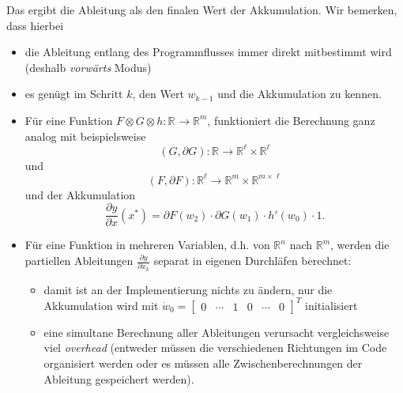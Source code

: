 \documentclass[
]{book}
\providecommand{\tightlist}{%
  \setlength{\itemsep}{0pt}\setlength{\parskip}{0pt}}
\theoremstyle{definition}
\theoremstyle{definition}
\theoremstyle{definition}
\theoremstyle{definition}
\theoremstyle{remark}
\begin{document}
Das ergibt die Ableitung als den finalen Wert der Akkumulation. Wir bemerken,
dass hierbei

\begin{itemize}
\tightlist
\item
  die Ableitung entlang des Programmflusses immer direkt mitbestimmt wird
  (deshalb \emph{vorwärts} Modus)
\item
  es genügt im Schritt \(k\), den Wert \(w_{k-1}\) und die Akkumulation zu
  kennen.
\item
  Für eine Funktion \(F\otimes G \otimes h \colon \mathbb R^{}\to \mathbb R^{m}\), funktioniert die Berechnung ganz analog mit beispielsweise
  \begin{equation*}
  (G, \partial G) \colon \mathbb R^{} \to \mathbb R^{\ell} \times  \mathbb R^{\ell}
  \end{equation*}
  und
  \begin{equation*}
  (F, \partial F) \colon \mathbb R^{\ell} \to \mathbb R^{m} \times  \mathbb
  R^{m \times \ell}
  \end{equation*}
  und der Akkumulation
  \begin{equation*}
  \frac{\partial y}{\partial x}(x^*) = \partial F(w_2)\cdot \partial G(w_1)\cdot h'(w_0) \cdot 1.
  \end{equation*}
\item
  Für eine Funktion in mehreren Variablen, d.h. von \(\mathbb R^{n}\) nach \(\mathbb R^{m}\), werden die
  partiellen Ableitungen \(\frac{\partial y}{\partial x_k}\) separat in eigenen Durchläfen berechnet:

  \begin{itemize}
  \tightlist
  \item
    damit ist an der Implementierung nichts zu ändern, nur die
    Akkumulation wird mit \(\dot w_0 = \begin{bmatrix} 0 & \dotsm & 1 & 0 & \dotsm & 0 \end{bmatrix}^T\) initialisiert
  \item
    eine simultane Berechnung aller Ableitungen verursacht vergleichsweise
    viel \emph{overhead} (entweder müssen die verschiedenen Richtungen im
    Code
    organisiert werden oder es müssen alle Zwischenberechnungen der
    Ableitung gespeichert werden).
  \end{itemize}
\end{itemize}
\end{document}
